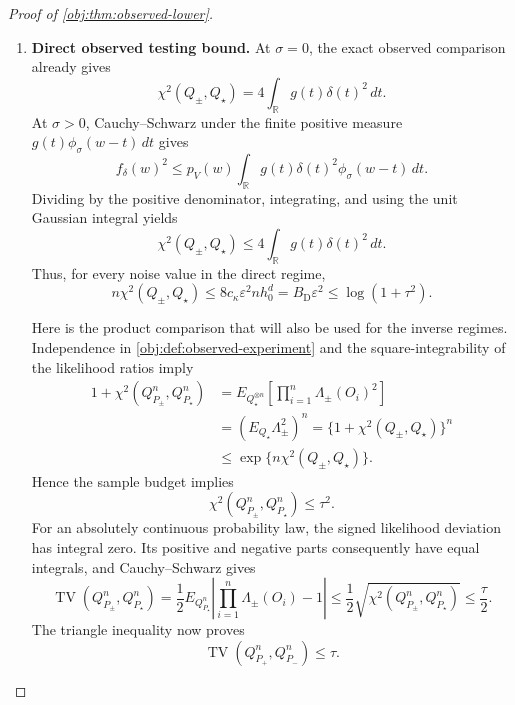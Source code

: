 \begin{proof}[Proof of \cref{obj:thm:observed-lower}]
\begin{enumerate}
\item \textbf{Direct observed testing bound.}
At \(\sigma=0\), the exact observed comparison already gives
\[
\chi^2(Q_\pm,Q_\star)
=4\int_{\mathbb R}g(t)\delta(t)^2\,dt.
\]
At \(\sigma>0\), Cauchy--Schwarz under the finite positive measure
\(g(t)\phi_\sigma(w-t)\,dt\) gives
\[
f_\delta(w)^2
\le
p_V(w)\int_{\mathbb R}
g(t)\delta(t)^2\phi_\sigma(w-t)\,dt.
\]
Dividing by the positive denominator, integrating, and using the unit Gaussian integral yields
\[
\chi^2(Q_\pm,Q_\star)
\le4\int_{\mathbb R}g(t)\delta(t)^2\,dt.
\]
Thus, for every noise value in the direct regime,
\[
n\chi^2(Q_\pm,Q_\star)
\le8c_\kappa\varepsilon^2nh_0^d
=B_{\mathrm D}\varepsilon^2
\le\log(1+\tau^2).
\]

Here is the product comparison that will also be used for the inverse regimes. Independence in \cref{obj:def:observed-experiment} and the square-integrability of the likelihood ratios imply
\[
\begin{aligned}
1+\chi^2(Q_{P_\pm}^n,Q_{P_\star}^n)
&=
E_{Q_\star^{\otimes n}}
\left[\prod_{i=1}^n\Lambda_\pm(O_i)^2\right]\\
&=
\left(E_{Q_\star}\Lambda_\pm^2\right)^n
=\{1+\chi^2(Q_\pm,Q_\star)\}^n\\
&\le\exp\{n\chi^2(Q_\pm,Q_\star)\}.
\end{aligned}
\]
Hence the sample budget implies
\[
\chi^2(Q_{P_\pm}^n,Q_{P_\star}^n)\le\tau^2.
\]
For an absolutely continuous probability law, the signed likelihood deviation has integral zero. Its positive and negative parts consequently have equal integrals, and Cauchy--Schwarz gives
\[
\operatorname{TV}(Q_{P_\pm}^n,Q_{P_\star}^n)
=
\frac12E_{Q_{P_\star}^n}
\left|\prod_{i=1}^n\Lambda_\pm(O_i)-1\right|
\le\frac12\sqrt{\chi^2(Q_{P_\pm}^n,Q_{P_\star}^n)}
\le\frac\tau2.
\]
The triangle inequality now proves
\[
\operatorname{TV}(Q_{P_+}^n,Q_{P_-}^n)\le\tau.
\]


\end{enumerate}
\end{proof}
